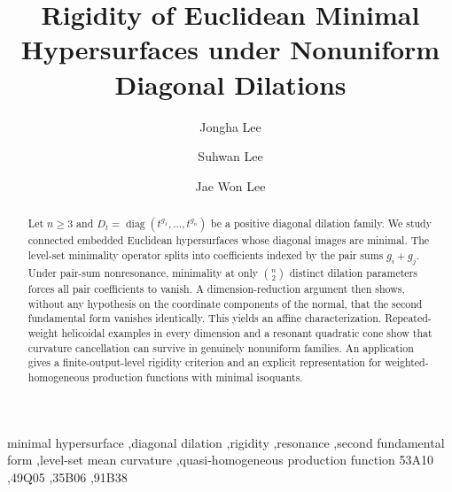 \documentclass[preprint,12pt]{elsarticle}
\numberwithin{equation}{section}
\theoremstyle{definition}\newtheorem{definition}[theorem]{Definition}
\theoremstyle{remark}\newtheorem{remark}[theorem]{Remark}
\begin{document}
\begin{frontmatter}

\title{Rigidity of Euclidean Minimal Hypersurfaces under Nonuniform Diagonal Dilations}

\author[chosun]{Jongha Lee}

\author[krei]{Suhwan Lee}

\author[gnu]{Jae Won Lee}


\begin{abstract}
Let $n\ge3$ and $D_t=\operatorname{diag}(t^{g_1},\ldots,t^{g_n})$ be a positive diagonal dilation family. We study connected embedded Euclidean hypersurfaces whose diagonal images are minimal. The level-set minimality operator splits into coefficients indexed by the pair sums $g_i+g_j$. Under pair-sum nonresonance, minimality at only $\binom n2$ distinct dilation parameters forces all pair coefficients to vanish. A dimension-reduction argument then shows, without any hypothesis on the coordinate components of the normal, that the second fundamental form vanishes identically. This yields an affine characterization. Repeated-weight helicoidal examples in every dimension and a resonant quadratic cone show that curvature cancellation can survive in genuinely nonuniform families. An application gives a finite-output-level rigidity criterion and an explicit representation for weighted-homogeneous production functions with minimal isoquants.
\end{abstract}

\begin{keyword}
minimal hypersurface \sep diagonal dilation \sep rigidity \sep resonance \sep second fundamental form \sep level-set mean curvature \sep quasi-homogeneous production function
\MSC[2020] 53A10 \sep 49Q05 \sep 35B06 \sep 91B38
\end{keyword}

\end{frontmatter}
\end{document}
